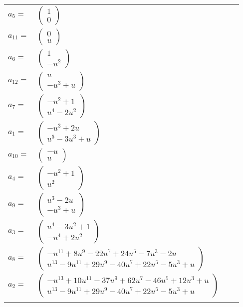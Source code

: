 \documentclass[1p]{elsarticle_modified}
\theoremstyle{definition}
\begin{document}
\begin{tabular}{m{7pt} m{180pt} m{7pt} m{180pt} }
\flushright $a_{5}=$&$\begin{pmatrix}1\\0\end{pmatrix}$ \\
\flushright $a_{11}=$&$\begin{pmatrix}0\\u\end{pmatrix}$ \\
\flushright $a_{6}=$&$\begin{pmatrix}1\\- u^2\end{pmatrix}$ \\
\flushright $a_{12}=$&$\begin{pmatrix}u\\- u^3+u\end{pmatrix}$ \\
\flushright $a_{7}=$&$\begin{pmatrix}- u^2+1\\u^4-2 u^2\end{pmatrix}$ \\
\flushright $a_{1}=$&$\begin{pmatrix}- u^3+2 u\\u^5-3 u^3+u\end{pmatrix}$ \\
\flushright $a_{10}=$&$\begin{pmatrix}- u\\u\end{pmatrix}$ \\
\flushright $a_{4}=$&$\begin{pmatrix}- u^2+1\\u^2\end{pmatrix}$ \\
\flushright $a_{9}=$&$\begin{pmatrix}u^3-2 u\\- u^3+u\end{pmatrix}$ \\
\flushright $a_{3}=$&$\begin{pmatrix}u^4-3 u^2+1\\- u^4+2 u^2\end{pmatrix}$ \\
\flushright $a_{8}=$&$\begin{pmatrix}- u^{11}+8 u^9-22 u^7+24 u^5-7 u^3-2 u\\u^{13}-9 u^{11}+29 u^9-40 u^7+22 u^5-5 u^3+u\end{pmatrix}$ \\
\flushright $a_{2}=$&$\begin{pmatrix}- u^{13}+10 u^{11}-37 u^9+62 u^7-46 u^5+12 u^3+u\\u^{13}-9 u^{11}+29 u^9-40 u^7+22 u^5-5 u^3+u\end{pmatrix}$\\&\end{tabular}
\end{document}
